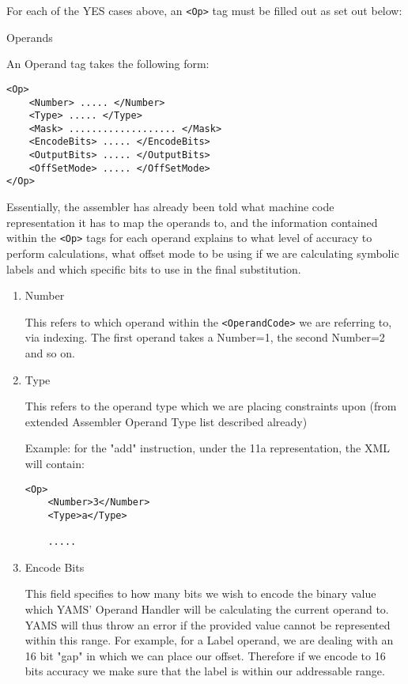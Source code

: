 \begin{enumerate}
\begin{enumerate}
For each of the YES cases above, an \verb"<Op>" tag must be filled out as set out below:

Operands

An Operand tag takes the following form:

\begin{verbatim}
<Op>
	<Number> ..... </Number>
	<Type> ..... </Type>
	<Mask> ................... </Mask>
	<EncodeBits> ..... </EncodeBits>
	<OutputBits> ..... </OutputBits>
	<OffSetMode> ..... </OffSetMode>
</Op>
\end{verbatim}

Essentially, the assembler has already been told what machine code representation it has to map the operands to, and the information contained within the \verb"<Op>" tags for each operand explains to what level of accuracy to perform calculations, what offset mode to be using if we are calculating symbolic labels and which specific bits to use in the final substitution.

\begin{enumerate}

\item Number

This refers to which operand within the \verb"<OperandCode>" we are referring to, via indexing. The first operand takes a Number=1, the second Number=2 and so on.

\item Type

This refers to the operand type which we are placing constraints upon (from extended Assembler Operand Type list described already)


Example: for the "add" instruction, under the 11a representation, the XML will contain:

\begin{verbatim}
<Op>
	<Number>3</Number>
	<Type>a</Type>

	.....
\end{verbatim}

\item Encode Bits

This field specifies to how many bits we wish to encode the binary value which YAMS' Operand Handler will be calculating the current operand to.
YAMS will thus throw an error if the provided value cannot be represented within this range. For example, for a Label operand, we are dealing with an 16 bit "gap" in which we can place our offset. Therefore if we encode to 16 bits accuracy we make sure that the label is within our addressable range.


\end{enumerate}
\end{enumerate}
\end{enumerate}
